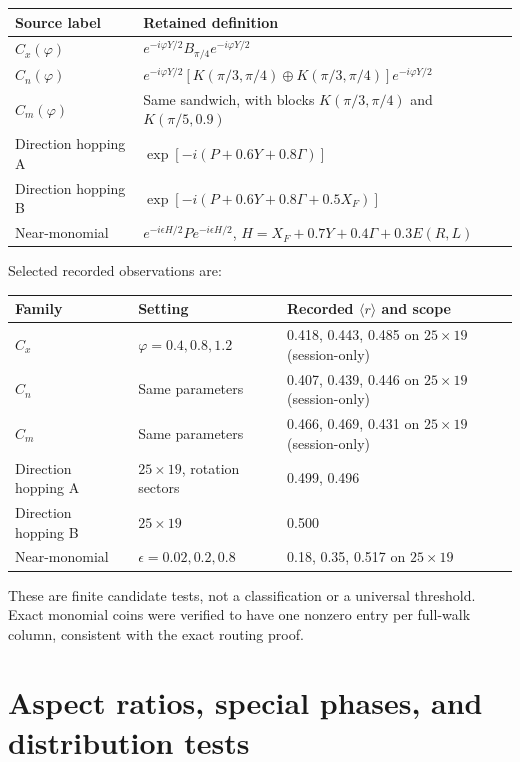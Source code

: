 \documentclass[11pt,a4paper,oneside]{report}
\numberwithin{equation}{chapter}
\begin{document}
\begin{center}
\small
\begin{tabularx}{\textwidth}{@{}lY@{}}
\toprule
Source label&Retained definition\\
\midrule
\(C_x(\varphi)\)&\(e^{-i\varphi Y/2}B_{\pi/4}e^{-i\varphi Y/2}\)\\
\(C_n(\varphi)\)&\(e^{-i\varphi Y/2}[K(\pi/3,\pi/4)\oplus K(\pi/3,\pi/4)]e^{-i\varphi Y/2}\)\\
\(C_m(\varphi)\)&Same sandwich, with blocks \(K(\pi/3,\pi/4)\) and \(K(\pi/5,0.9)\)\\
Direction hopping A&\(\exp[-i(P+0.6Y+0.8\Gamma)]\)\\
Direction hopping B&\(\exp[-i(P+0.6Y+0.8\Gamma+0.5X_F)]\)\\
Near-monomial&\(e^{-i\epsilon H/2}P e^{-i\epsilon H/2}\),
\(H=X_F+0.7Y+0.4\Gamma+0.3E(R,L)\)\\
\bottomrule
\end{tabularx}
\end{center}
Selected recorded observations are:
\begin{center}
\small
\begin{tabularx}{\textwidth}{@{}llY@{}}
\toprule
Family&Setting&Recorded \(\langle r\rangle\) and scope\\
\midrule
\(C_x\)&\(\varphi=0.4,0.8,1.2\)&0.418, 0.443, 0.485 on \(25\times19\) (session-only)\\
\(C_n\)&Same parameters&0.407, 0.439, 0.446 on \(25\times19\) (session-only)\\
\(C_m\)&Same parameters&0.466, 0.469, 0.431 on \(25\times19\) (session-only)\\
Direction hopping A&\(25\times19\), rotation sectors&0.499, 0.496\\
Direction hopping B&\(25\times19\)&0.500\\
Near-monomial&\(\epsilon=0.02,0.2,0.8\)&0.18, 0.35, 0.517 on \(25\times19\)\\
\bottomrule
\end{tabularx}
\end{center}
These are finite candidate tests, not a classification or a universal
threshold. Exact monomial coins were
verified to have one nonzero entry per full-walk column, consistent
with the exact routing proof.

\section{Aspect ratios, special phases, and distribution tests}
\end{document}
